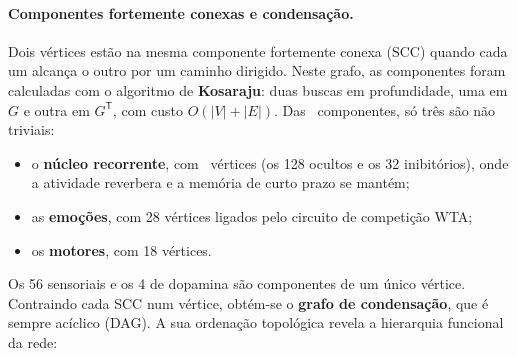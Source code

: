 \documentclass[11pt,a4paper]{article}
\begin{document}
\paragraph{Componentes fortemente conexas e condensação.} Dois vértices estão na mesma componente fortemente conexa (SCC) quando
cada um alcança o outro por um caminho dirigido. Neste grafo, as componentes foram calculadas com o algoritmo de
\textbf{Kosaraju}: duas buscas em profundidade, uma em $G$ e outra em $G^{\mathsf T}$, com custo $O(|V|+|E|)$. Das \gComp\
componentes, só três são não triviais:
\begin{itemize}
  \item o \textbf{núcleo recorrente}, com \gMaiorComp\ vértices (os 128 ocultos e os 32 inibitórios), onde a atividade reverbera
        e a memória de curto prazo se mantém;
  \item as \textbf{emoções}, com 28 vértices ligados pelo circuito de competição WTA;
  \item os \textbf{motores}, com 18 vértices.
\end{itemize}
Os 56 sensoriais e os 4 de dopamina são componentes de um único vértice. Contraindo cada SCC num vértice, obtém-se o
\textbf{grafo de condensação}, que é sempre acíclico (DAG). A sua ordenação topológica revela a hierarquia funcional da rede:

\begin{center}
\end{center}
\end{document}
